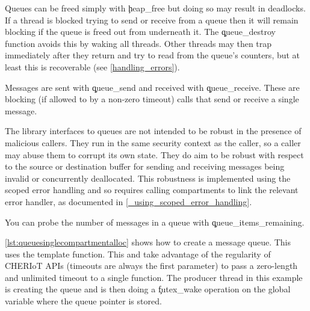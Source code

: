 
Queues can be freed simply with \c{heap_free} but doing so may result in deadlocks.
If a thread is blocked trying to send or receive from a queue then it will remain blocking if the queue is freed out from underneath it.
The \c{queue_destroy} function avoids this by waking all threads.
Other threads may then trap immediately after they return and try to read from the queue's counters, but at least this is recoverable (see \ref{handling_errors}).


Messages are sent with \c{queue_send} and received with \c{queue_receive}.
These are blocking (if allowed to by a non-zero timeout) calls that send or receive a single message.



\begin{caution}
The library interfaces to queues are not intended to be robust in the presence of malicious callers.
They run in the same security context as the caller, so a caller may abuse them to corrupt its own state.
They do aim to be robust with respect to the source or destination buffer for sending and receiving messages being invalid or concurrently deallocated.
This robustness is implemented using the scoped error handling and so requires calling compartments to link the relevant error handler, as documented in \ref{_using_scoped_error_handling}.
\end{caution}

You can probe the number of messages in a queue with \c{queue_items_remaining}.


\ref{lst:queuesinglecompartmentalloc} shows how to create a message queue.
This uses the  template function.
This and  take advantage of the regularity of CHERIoT APIs (timeouts are always the first parameter) to pass a zero-length and unlimited timeout to a single function.
The producer thread in this example is creating the queue and is then doing a \c{futex_wake} operation on the global variable where the queue pointer is stored.

